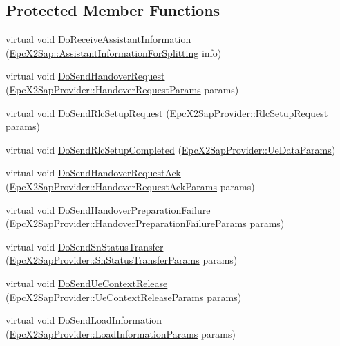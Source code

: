 \subsection*{Protected Member Functions}
\begin{DoxyCompactItemize}
\item 
virtual void \hyperlink{classns3_1_1EpcX2_a11444fc4651106c67e0d0566c8b61e1b}{Do\+Receive\+Assistant\+Information} (\hyperlink{structns3_1_1EpcX2Sap_1_1AssistantInformationForSplitting}{Epc\+X2\+Sap\+::\+Assistant\+Information\+For\+Splitting} info)
\item 
virtual void \hyperlink{classns3_1_1EpcX2_a8008ce25fcdf78a02d7945768ae3084b}{Do\+Send\+Handover\+Request} (\hyperlink{structns3_1_1EpcX2Sap_1_1HandoverRequestParams}{Epc\+X2\+Sap\+Provider\+::\+Handover\+Request\+Params} params)
\item 
virtual void \hyperlink{classns3_1_1EpcX2_a856195e67f43bc851705e045eb876639}{Do\+Send\+Rlc\+Setup\+Request} (\hyperlink{structns3_1_1EpcX2Sap_1_1RlcSetupRequest}{Epc\+X2\+Sap\+Provider\+::\+Rlc\+Setup\+Request} params)
\item 
virtual void \hyperlink{classns3_1_1EpcX2_a46a90945c5f509e7098cb4668294b835}{Do\+Send\+Rlc\+Setup\+Completed} (\hyperlink{structns3_1_1EpcX2Sap_1_1UeDataParams}{Epc\+X2\+Sap\+Provider\+::\+Ue\+Data\+Params})
\item 
virtual void \hyperlink{classns3_1_1EpcX2_a0c10744b59810accae456d5e7a5ebf3b}{Do\+Send\+Handover\+Request\+Ack} (\hyperlink{structns3_1_1EpcX2Sap_1_1HandoverRequestAckParams}{Epc\+X2\+Sap\+Provider\+::\+Handover\+Request\+Ack\+Params} params)
\item 
virtual void \hyperlink{classns3_1_1EpcX2_a6b426becb1b31625fc2aada18d825d70}{Do\+Send\+Handover\+Preparation\+Failure} (\hyperlink{structns3_1_1EpcX2Sap_1_1HandoverPreparationFailureParams}{Epc\+X2\+Sap\+Provider\+::\+Handover\+Preparation\+Failure\+Params} params)
\item 
virtual void \hyperlink{classns3_1_1EpcX2_adab34a68d321212ad653935239fedd4e}{Do\+Send\+Sn\+Status\+Transfer} (\hyperlink{structns3_1_1EpcX2Sap_1_1SnStatusTransferParams}{Epc\+X2\+Sap\+Provider\+::\+Sn\+Status\+Transfer\+Params} params)
\item 
virtual void \hyperlink{classns3_1_1EpcX2_a21fd33c24044a655a707fc0b68961fef}{Do\+Send\+Ue\+Context\+Release} (\hyperlink{structns3_1_1EpcX2Sap_1_1UeContextReleaseParams}{Epc\+X2\+Sap\+Provider\+::\+Ue\+Context\+Release\+Params} params)
\item 
virtual void \hyperlink{classns3_1_1EpcX2_aa6e72c1fe568b09e0527de001ac33d8e}{Do\+Send\+Load\+Information} (\hyperlink{structns3_1_1EpcX2Sap_1_1LoadInformationParams}{Epc\+X2\+Sap\+Provider\+::\+Load\+Information\+Params} params)

\end{DoxyCompactItemize}
